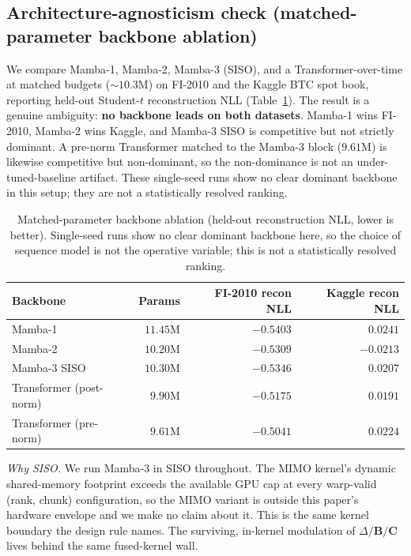 \documentclass{article}
\begin{document}
\subsection{Architecture-agnosticism check (matched-parameter backbone ablation)}\label{sec:ablation}

We compare Mamba-1, Mamba-2, Mamba-3 (SISO), and a Transformer-over-time at matched
budgets ($\sim10.3$M) on FI-2010 and the Kaggle BTC spot book, reporting held-out
Student-$t$ reconstruction NLL (Table~\ref{tab:backbone}). The result is a genuine
ambiguity: \textbf{no backbone leads on both datasets}. Mamba-1 wins FI-2010, Mamba-2
wins Kaggle, and Mamba-3 SISO is competitive but not strictly dominant. A pre-norm
Transformer matched to the Mamba-3 block ($9.61$M) is likewise competitive but
non-dominant, so the non-dominance is not an under-tuned-baseline artifact. These
single-seed runs show no clear dominant backbone in this setup; they are not a
statistically resolved ranking.

\begin{table}[t]
\centering
\small
\begin{tabular}{lrrr}
\toprule
Backbone & Params & FI-2010 recon NLL & Kaggle recon NLL \\
\midrule
Mamba-1                 & $11.45$M & $\mathbf{-0.5403}$ & $0.0241$ \\
Mamba-2                 & $10.20$M & $-0.5309$ & $\mathbf{-0.0213}$ \\
Mamba-3 SISO            & $10.30$M & $-0.5346$ & $0.0207$ \\
Transformer (post-norm) & $9.90$M  & $-0.5175$ & $0.0191$ \\
Transformer (pre-norm)  & $9.61$M  & $-0.5041$ & $0.0224$ \\
\bottomrule
\end{tabular}
\caption{Matched-parameter backbone ablation (held-out reconstruction NLL, lower
is better). Single-seed runs show no clear dominant backbone here, so the choice of
sequence model is not the operative variable; this is not a statistically resolved
ranking.}
\label{tab:backbone}
\end{table}

\emph{Why SISO.} We run Mamba-3 in SISO throughout. The MIMO kernel's dynamic
shared-memory footprint exceeds the available GPU cap at every warp-valid
(rank, chunk) configuration, so the MIMO variant is outside this paper's hardware
envelope and we make no claim about it. This is the same kernel boundary the design
rule names. The surviving, in-kernel modulation of $\Delta/\mathbf{B}/\mathbf{C}$
lives behind the same fused-kernel wall.
\end{document}
